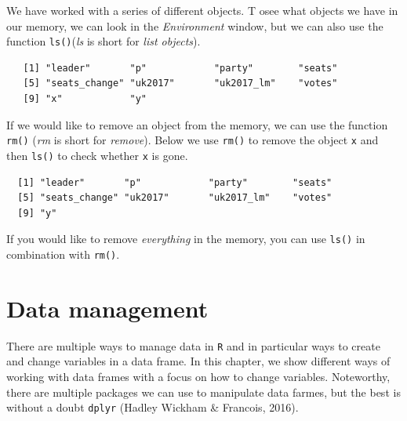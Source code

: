 \documentclass[12pt,oneside]{reedthesis}
\theoremstyle{definition}
\theoremstyle{definition}
\theoremstyle{definition}
\theoremstyle{remark}
\begin{document}
  We have worked with a series of different objects. T osee what objects
  we have in our memory, we can look in the \emph{Environment} window, but
  we can also use the function \texttt{ls()}(\emph{ls} is short for
  \emph{list objects}).
  \begin{Shaded}
  \begin{Highlighting}[]
  \NormalTok{()}
  \end{Highlighting}
  \end{Shaded}
  \begin{verbatim}
   [1] "leader"       "p"            "party"        "seats"       
   [5] "seats_change" "uk2017"       "uk2017_lm"    "votes"       
   [9] "x"            "y"           
  \end{verbatim}
  If we would like to remove an object from the memory, we can use the
  function \texttt{rm()} (\emph{rm} is short for \emph{remove}). Below we
  use \texttt{rm()} to remove the object \texttt{x} and then \texttt{ls()}
  to check whether \texttt{x} is gone.
  \begin{Shaded}
  \begin{Highlighting}[]
  
  \NormalTok{()}
  \end{Highlighting}
  \end{Shaded}
  \begin{verbatim}
  [1] "leader"       "p"            "party"        "seats"       
  [5] "seats_change" "uk2017"       "uk2017_lm"    "votes"       
  [9] "y"           
  \end{verbatim}
  If you would like to remove \emph{everything} in the memory, you can use
  \texttt{ls()} in combination with \texttt{rm()}.
  \begin{Shaded}
  \begin{Highlighting}[]
  \NormalTok{(} \NormalTok{())}
  
  \NormalTok{()}
  \end{Highlighting}
  \end{Shaded}
  \chapter{Data management}\label{data}
  
  There are multiple ways to manage data in \texttt{R} and in particular
  ways to create and change variables in a data frame. In this chapter, we
  show different ways of working with data frames with a focus on how to
  change variables. Noteworthy, there are multiple packages we can use to
  manipulate data farmes, but the best is without a doubt \texttt{dplyr}
  (Hadley Wickham \& Francois, 2016).
  
\end{document}
